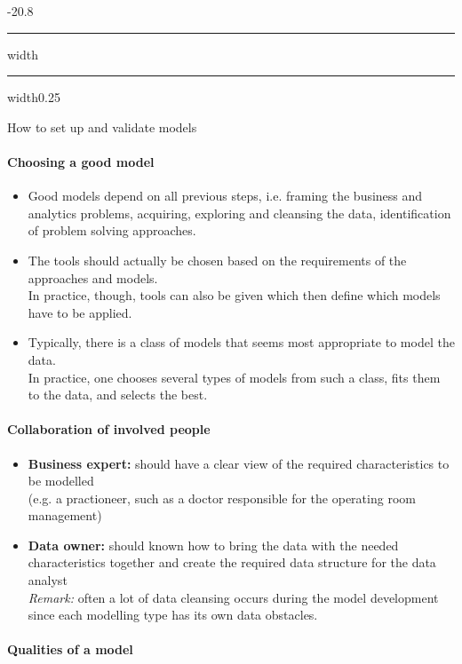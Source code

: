 \documentclass[a4paper, landscape, 6pt, fleqn]{scrartcl}
\makeatletter
\renewcommand{\emph}[1]{\textbf{#1}}
\renewcommand{\section}{\@startsection{section}{1}{0mm}%
{-2\baselineskip}{0.8\baselineskip}%
{\hrule depth 0.2pt width\columnwidth\hrule depth1.5pt
width0.25\columnwidth\vspace*{1.2em}\Large\bfseries}}
\makeatother
\begin{document}
\begin{multicols*}{4}
\section{How to set up and validate models}

\paragraph{Choosing a good model}

\begin{itemize}
\item Good models depend on all previous steps, i.e. framing the business and analytics problems, acquiring, exploring and cleansing the data, identification of problem solving approaches.
\item The tools should actually be chosen based on the requirements of the approaches and models. \\
In practice, though, tools can also be given which then define which models have to be applied.
\item Typically, there is a class of models that seems most appropriate to model the data. \\
In practice, one chooses several types of models from such a class, fits them to the data, and selects the best.
\end{itemize}

\paragraph{Collaboration of involved people}

\begin{itemize}
\item \emph{Business expert:} should have a clear view of the required characteristics to be modelled \\
(e.g. a practioneer, such as a doctor responsible for the operating room management)
\item \emph{Data owner:} should known how to bring the data with the needed characteristics together and create the required data structure for the data analyst \\
\textit{Remark:} often a lot of data cleansing occurs during the model development since each modelling type has its own data obstacles.
\end{itemize}

\paragraph{Qualities of a model}


\end{multicols*}
\end{document}
